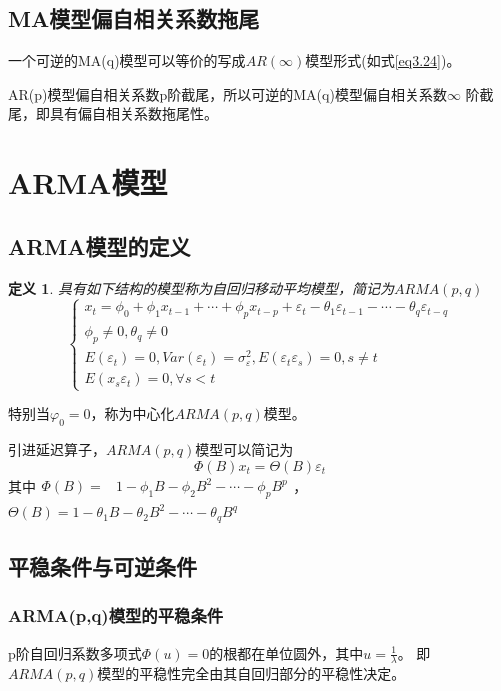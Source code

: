 \documentclass[12pt, a4paper, oneside]{ctexbook}
\newtheorem{definition}[theorem]{定义}
\begin{document}
\subsection{MA模型偏自相关系数拖尾}
一个可逆的MA(q)模型可以等价的写成$AR(\infty)$模型形式(如式\ref{eq3.24})。

AR(p)模型偏自相关系数p阶截尾，所以可逆的MA(q)模型偏自相关系数$\infty$
阶截尾，即具有偏自相关系数拖尾性。

\section{ARMA模型}
\subsection{ARMA模型的定义}
\begin{definition}
    具有如下结构的模型称为自回归移动平均模型，简记为$ARMA(p,q)$
    \begin{equation}
        \begin{cases}
            x_t=\phi_0+\phi_1x_{t-1}+\cdots+\phi_px_{t-p}+\varepsilon_t-\theta_1\varepsilon_{t-1}-\cdots-\theta_q\varepsilon_{t-q} \\
            \phi_p\neq0,\theta_q\neq0                                                                                              \\
            E(\varepsilon_t)=0,Var(\varepsilon_t)=\sigma_\varepsilon^2,E(\varepsilon_t\varepsilon_s)=0,s\neq t                     \\
            E(x_s\varepsilon_t)=0,\forall s<t
        \end{cases}
    \end{equation}
\end{definition}
特别当$\varphi_0 = 0$，称为中心化$ARMA(p,q)$模型。

引进延迟算子，$ARMA(p,q)$模型可以简记为
\begin{equation}
    \Phi(B)x_t=\Theta(B)\varepsilon_t
\end{equation}
其中$\begin{aligned}\Phi(B)=&1-\phi_1B-\phi_2B^2-\cdots-\phi_pB^p\end{aligned}$，
$\Theta(B)=1-\theta_1B-\theta_2B^2-\cdots-\theta_qB^q$

\subsection{平稳条件与可逆条件}
\subsubsection{ARMA(p,q)模型的平稳条件}
p阶自回归系数多项式$\Phi(u)=0$的根都在单位圆外，其中$u = \frac1\lambda$。
即$ARMA(p,q)$模型的平稳性完全由其自回归部分的平稳性决定。
\end{document}
